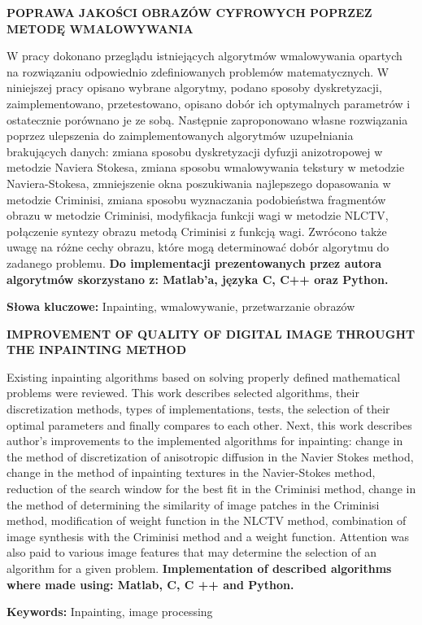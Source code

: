 \newpage
\begin{center}
\large \bf
POPRAWA JAKOŚCI OBRAZÓW CYFROWYCH POPRZEZ METODĘ WMALOWYWANIA
\end{center}

W pracy dokonano przeglądu istniejących algorytmów wmalowywania opartych na rozwiązaniu odpowiednio zdefiniowanych problemów matematycznych. W niniejszej pracy opisano wybrane algorytmy, podano sposoby dyskretyzacji, zaimplementowano, przetestowano, opisano dobór ich optymalnych parametrów i ostatecznie porównano je ze sobą. Następnie zaproponowano własne rozwiązania poprzez ulepszenia do zaimplementowanych algorytmów uzupełniania brakujących danych: zmiana sposobu dyskretyzacji dyfuzji anizotropowej w metodzie Naviera Stokesa, zmiana sposobu wmalowywania tekstury w metodzie Naviera-Stokesa, zmniejszenie okna poszukiwania najlepszego dopasowania w metodzie Criminisi, zmiana sposobu wyznaczania podobieństwa fragmentów obrazu w metodzie Criminisi,  modyfikacja funkcji wagi w metodzie NLCTV, połączenie syntezy obrazu metodą Criminisi z funkcją wagi. Zwrócono także uwagę na różne cechy obrazu, które mogą determinować dobór algorytmu do zadanego problemu. \textbf{Do implementacji prezentowanych przez autora algorytmów skorzystano z: Matlab'a, języka C, C++ oraz Python.}

\bigskip
{\noindent \bf Słowa kluczowe:} Inpainting, wmalowywanie, przetwarzanie obrazów

\vskip 1cm

\begin{center}
\large \bf
IMPROVEMENT OF QUALITY OF DIGITAL IMAGE THROUGHT THE INPAINTING METHOD
\end{center}

Existing inpainting algorithms based on solving properly defined mathematical problems were reviewed. This work describes selected algorithms, their discretization methods, types of implementations, tests, the selection of their optimal parameters and finally compares to each other.
Next, this work describes author's improvements to the implemented algorithms for inpainting: change in the method of discretization of anisotropic diffusion in the Navier Stokes method, change in the method of inpainting textures in the Navier-Stokes method, reduction of the search window for the best fit in the Criminisi method, change in the method of determining the similarity of image patches in the Criminisi method, modification of weight function in the NLCTV method, combination of image synthesis with the Criminisi method and a weight function.
Attention was also paid to various image features that may determine the selection of an algorithm for a given problem. \textbf {Implementation of described algorithms where made using: Matlab, C, C ++ and Python.}

\bigskip
{\noindent \bf Keywords:} Inpainting, image processing

\vfill
